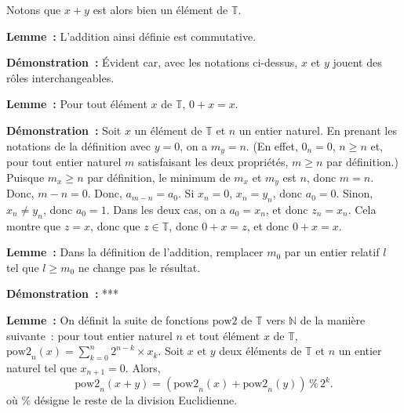     Notons que $x + y$ est alors bien un élément de $\mathbb{T}$.

\medskip

\noindent\textbf{Lemme :} L'addition ainsi définie est commutative.

\medskip

\noindent\textbf{Démonstration :} Évident car, avec les notations ci-dessus, $x$ et $y$ jouent des rôles interchangeables.

\done

\medskip

\noindent\textbf{Lemme :} Pour tout élément $x$ de $\mathbb{T}$, $0 + x = x$.

\medskip

\noindent\textbf{Démonstration :} Soit $x$ un élément de $\mathbb{T}$ et $n$ un entier naturel.
    En prenant les notations de la définition avec $y = 0$, on a $m_y = n$. 
    (En effet, $0_n = 0$, $n \geq n$ et, pour tout entier naturel $m$ satisfaisant les deux propriétés, $m \geq n$ par définition.)
    Puisque $m_x \geq n$ par définition, le minimum de $m_x$ et $m_y$ est $n$, donc $m = n$.
    Donc, $m-n = 0$.
    Donc, $a_{m-n} = a_0$.
    Si $x_n = 0$, $x_n = y_n$, donc $a_0 = 0$.
    Sinon, $x_n \neq y_n$, donc $a_0 = 1$.
    Dans les deux cas, on a $a_0 = x_n$, et donc $z_n = x_n$.
    Cela montre que $z = x$, donc que $z \in \mathbb{T}$, donc $0 + x = z$, et donc $0 + x = x$.

    \done

\medskip

\noindent\textbf{Lemme :} Dans la définition de l'addition, remplacer $m_0$ par un entier relatif $l$ tel que $l \geq m_0$ ne change pas le résultat.

\medskip

\noindent\textbf{Démonstration :} ***

\medskip

\noindent\textbf{Lemme :} On définit la suite de fonctions $\mathrm{pow2}$ de $\mathbb{T}$ vers $\mathbb{N}$ de la manière suivante : pour tout entier naturel $n$ et tout élément $x$ de $\mathbb{T}$, $\mathrm{pow2}_n(x) = \sum_{k=0}^n 2^{n-k} \times x_k$.
Soit $x$ et $y$ deux éléments de $\mathbb{T}$ et $n$ un entier naturel tel que $x_{n+1} = 0$.
Alors, 
\begin{equation*}
    \mathrm{pow2}_n(x+y) = (\mathrm{pow2}_n(x) + \mathrm{pow2}_n(y)) \mathrel{\%} 2^k. 
\end{equation*}
où $\%$ désigne le reste de la division Euclidienne.

